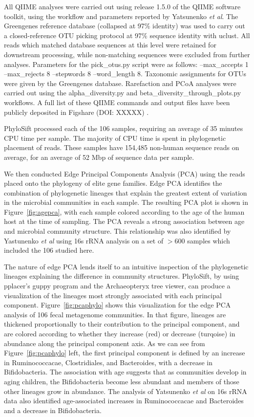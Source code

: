 \documentclass[10pt]{article}
\begin{document}
All QIIME analyses were carried out using release 1.5.0 of the QIIME software toolkit, using the workflow and parameters reported by Yatsunenko \textit{et al}. The Greengenes reference database (collapsed at 97\% identity) was used to carry out a closed-reference OTU picking protocol at 97\% sequence identity with uclust. All reads which matched database sequences at this level were retained for downstream processing, while non-matching sequences were excluded from further analyses. Parameters for the pick\_otus.py script were as follows: --max\_accepts 1 --max\_rejects 8 --stepwords 8 --word\_length 8. Taxonomic assignments for OTUs were given by the Greengenes database. Rarefaction and PCoA analyses were carried out using the alpha\_diversity.py and beta\_diversity\_through\_plots.py workflows. A full list of these QIIME commands and output files have been publicly deposited in Figshare (DOI: XXXXX) .

PhyloSift processed each of the 106 samples, requiring an average of 35 minutes CPU time per sample.
The majority of CPU time is spent in phylogenetic placement of reads.
These samples have 154,485 non-human sequence reads on average, for an average of 52 Mbp of sequence data per sample.

We then conducted Edge Principal Components Analysis (PCA) using the reads placed onto the phylogeny of elite gene families.
Edge PCA identifies the combination of phylogenetic lineages that explain the greatest extent of variation in the microbial communities in each sample.
The resulting PCA plot is shown in Figure~\ref{fig:agepca}, with each sample colored according to the age of the human host at the time of sampling.
The PCA reveals a strong association between age and microbial community structure.
This relationship was also identified by Yastunenko \textit{et al} using 16s rRNA analysis on a set of $>$600 samples which included the 106 studied here.

The nature of edge PCA lends itself to an intuitive inspection of the phylogenetic lineages explaining the difference in community structures.
PhyloSift, by using pplacer's guppy program and the Archaeopteryx tree viewer, can produce a visualization of the lineages most strongly associated with each principal component.
Figure~\ref{fig:pcaphylo} shows this visualization for the edge PCA analysis of 106 fecal metagenome communities.
In that figure, lineages are thickened proportionally to their contribution to the principal component, and are colored according to whether they increase (red) or decrease (turqoise) in abundance along the principal component axis.
As we can see from Figure~\ref{fig:pcaphylo} left, the first principal component is defined by an increase in Ruminococcacae, Clostridiales, and Bacteroides, with a decrease in Bifidobacteria.
The association with age suggests that as communities develop in aging children, the Bifidobacteria become less abundant and members of those other lineages grow in abundance.
The analysis of Yatsunenko \textit{et al} on 16s rRNA data also identified age-associated increases in Ruminococcacae and Bacteroides and a decrease in Bifidobacteria.
\end{document}
